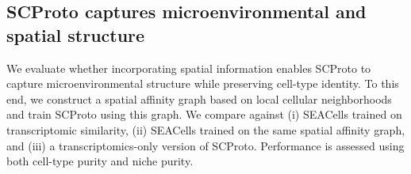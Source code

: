 \begin{table}[t]
\centering
\caption{Performance on rare cell types.
We report cell-type coverage (higher is better) and mean cell-type purity for low-frequency (rare) cell types (higher is better).}
\label{tab:rare_cells}
\end{table}

\subsection{SCProto captures microenvironmental and spatial structure}

We evaluate whether incorporating spatial information enables SCProto to capture microenvironmental structure while preserving cell-type identity. To this end, we construct a spatial affinity graph based on local cellular neighborhoods and train SCProto using this graph. We compare against (i) SEACells trained on transcriptomic similarity, (ii) SEACells trained on the same spatial affinity graph, and (iii) a transcriptomics-only version of SCProto. Performance is assessed using both cell-type purity and niche purity.


